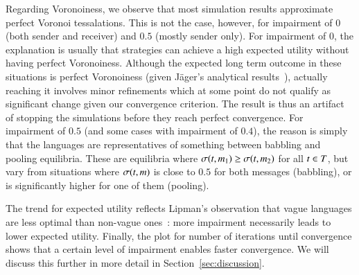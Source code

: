 Regarding Voronoiness, we observe that most simulation results approximate perfect Voronoi tessalations.
This is not the case, however, for impairment of $0$ (both sender and receiver) and $0.5$ (mostly sender only).
For impairment of $0$,  the explanation is usually that strategies can achieve a high expected utility without having perfect Voronoiness.
Although the expected long term outcome in these situations is perfect Voronoiness (given J\"ager's analytical results~\cite{Jager2007}), actually reaching it involves minor refinements which at some point do not qualify as significant change given our convergence criterion.
The result is thus an artifact of stopping the simulations before they reach perfect convergence.
For impairment of $0.5$ (and some cases with impairment of $0.4$), the reason is simply that the languages are representatives of something between babbling and pooling equilibria.
These are equilibria where $\sigma(t,m_1) \geq \sigma(t,m_2)$ for all $t \in T$, but vary from situations where $\sigma(t,m)$ is close to $0.5$ for both messages (babbling), or is significantly higher for one of them (pooling).

The trend for expected utility reflects Lipman's observation that vague languages are less optimal than non-vague ones~\cite{Lipman2009:Why-is-Language}: more impairment necessarily leads to lower expected utility.
Finally, the plot for number of iterations until convergence shows that a certain level of impairment enables faster convergence.
We will discuss this further in more detail in Section~\ref{sec:discussion}.






